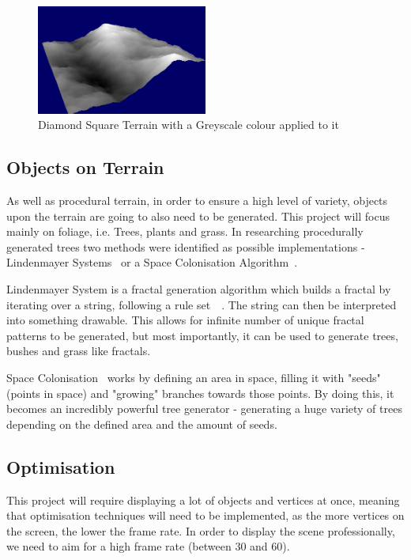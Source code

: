 \documentclass[a4paper,10pt]{report}
\begin{document}
\begin{figure}[h!]
    \centering
  \includegraphics[width=0.5\textwidth]{DiamondSquareGreyScale}
 \caption{Diamond Square Terrain with a Greyscale colour applied to it}
 \label{fig:DiamondSquareGrey}
\end{figure}

\subsection{Objects on Terrain}

As well as procedural terrain, in order to ensure a high level of variety, objects upon the terrain are going to also need to be generated. This project will focus mainly on foliage, i.e. Trees, plants and grass. In researching procedurally generated trees two methods were identified as possible implementations - Lindenmayer Systems~\cite{lindenmayer2017} or a Space Colonisation Algorithm~\cite{runions2007modeling}. 

Lindenmayer System is a fractal generation algorithm which builds a fractal by iterating over a string, following a rule set~\cite{prusinkiewicz2012algorithmic}~\cite{crownover1995introduction}. The string can then be interpreted into something drawable. This allows for infinite number of unique fractal patterns to be generated, but most importantly, it can be used to generate trees, bushes and grass like fractals.  

Space Colonisation~\cite{runions2007modeling} works by defining an area in space, filling it with "seeds" (points in space) and "growing" branches towards those points. By doing this, it becomes an incredibly powerful tree generator - generating a huge variety of trees depending on the defined area and the amount of seeds.

\subsection{Optimisation}
This project will require displaying a lot of objects and vertices at once, meaning that optimisation techniques will need to be implemented, as the more vertices on the screen, the lower the frame rate. In order to display the scene professionally, we need to aim for a high frame rate (between 30 and 60).  \medskip
\end{document}
